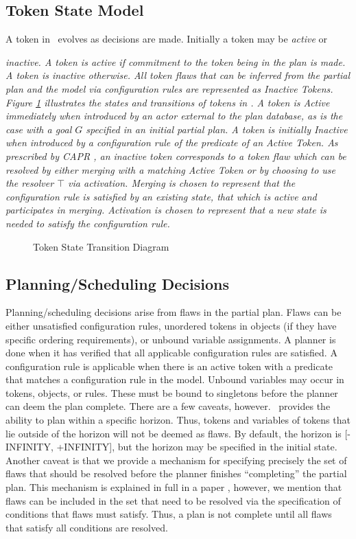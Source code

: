 \documentclass[10pt, letterpaper, twoside]{article}
\begin{document}
\subsection{Token State Model}
A token in \ET\, evolves as decisions are made.  Initially a token may be
{\em active} or {\em inactive.  A token is {\em active} if commitment to
the token being in the plan is made.  A token is {\em inactive} otherwise. 
All token flaws that can be inferred from the partial plan and the model
via configuration rules are represented as {\em Inactive Tokens}. Figure
\ref{TokenStateTransition} illustrates the states and transitions of tokens
in \ET. A token is {\em Active} immediately when introduced by an actor
external to the plan database, as is the case with a goal $G$ specified in
an initial partial plan. A token is initially {\em Inactive} when
introduced by a configuration rule of the predicate of an {\em Active
Token}.  As prescribed by CAPR \cite{e2}, an inactive token corresponds to
a token flaw which can be resolved by either {\em merging} with a matching
{\em Active Token} or by choosing to use the resolver $\top$ via {\em
activation}. Merging is chosen to represent that the configuration rule is
satisfied by an existing state, that which is active and participates in
merging. Activation is chosen to represent that a new state is needed to
satisfy the configuration rule. 
\begin{figure}[t]
\centering{}
\caption{Token State Transition Diagram}
\label{TokenStateTransition}
\end{figure}

\subsection{Planning/Scheduling Decisions}
Planning/scheduling decisions arise from flaws in the partial plan.  Flaws
can be either unsatisfied configuration rules, unordered tokens in objects
(if they have specific ordering requirements), or unbound variable
assignments.  A planner is done when it has verified that all applicable
configuration rules are satisfied.  A configuration rule is applicable when
there is an active token with a predicate that matches a configuration rule
in the model.  Unbound variables may occur in tokens, objects, or rules.
These must be bound to singletons before the planner can deem the plan
complete.  There are a few caveats, however.  \ET\, provides the ability to
plan within a specific horizon.  Thus, tokens and variables of tokens that
lie outside of the horizon will not be deemed as flaws.  By default, the
horizon is [-INFINITY, +INFINITY], but the horizon may be specified in the
initial state. Another caveat is that we provide a mechanism for specifying
precisely the set of flaws that should be resolved before the planner
finishes ``completing'' the partial plan.  This mechanism is explained in
full in a paper \cite{planid}, however, we mention that flaws can be
included in the set that need to be resolved via the specification of
conditions that flaws must satisfy.  Thus, a plan is not complete until all
flaws that satisfy all conditions are resolved.

}
\end{document}
